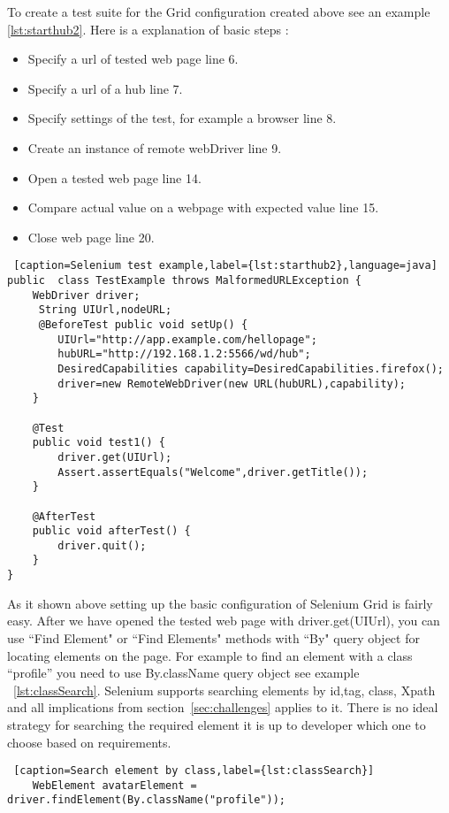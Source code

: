 	To create a test suite for the Grid configuration created above see an
	example \ref{lst:starthub2}. Here is a explanation of basic steps :
	\begin{itemize}
	  \item Specify a url of tested web page line 6.
	  \item Specify a url of a hub line 7.
	  \item Specify settings of the test, for example a browser line 8.
	  \item Create an instance of remote webDriver line 9.
	  \item Open a tested web page line 14.
	  \item Compare actual value on a webpage with expected value line 15.
	  \item Close web page line 20.
	\end{itemize}
	
	\lstset{style=a1listing}
	\begin{lstlisting} [caption=Selenium test example,label={lst:starthub2},language=java]
public 	class TestExample throws MalformedURLException {
 	WebDriver driver;
 	 String UIUrl,nodeURL;
 	 @BeforeTest public void setUp() {
 	 	UIUrl="http://app.example.com/hellopage"; 
		hubURL="http://192.168.1.2:5566/wd/hub";
		DesiredCapabilities capability=DesiredCapabilities.firefox();
		driver=new RemoteWebDriver(new URL(hubURL),capability);
	}
		
	@Test
	public void test1() {
		driver.get(UIUrl);
		Assert.assertEquals("Welcome",driver.getTitle());
	}
	
	@AfterTest
	public void afterTest() {
		driver.quit();
	}
}
	\end{lstlisting}

	As it shown above setting up the basic configuration of Selenium Grid is fairly
	easy. After we have opened the tested web page with driver.get(UIUrl), you can
	use ``Find Element" or ``Find Elements" methods with ``By" query object for
	locating elements on the page. For example to find an element with a
	class ``profile'' you need to use By.className query object see example
	~\ref{lst:classSearch}. Selenium  supports searching elements by id,tag, class,
	Xpath and all implications from section~\ref{sec:challenges} applies to it. 
	There is no ideal strategy for searching the required element it is up
	to developer which one to choose based on requirements.
	
	\lstset{style=a1listing}
	\begin{lstlisting} [caption=Search element by class,label={lst:classSearch}]
	WebElement avatarElement = driver.findElement(By.className("profile"));
	\end{lstlisting}


